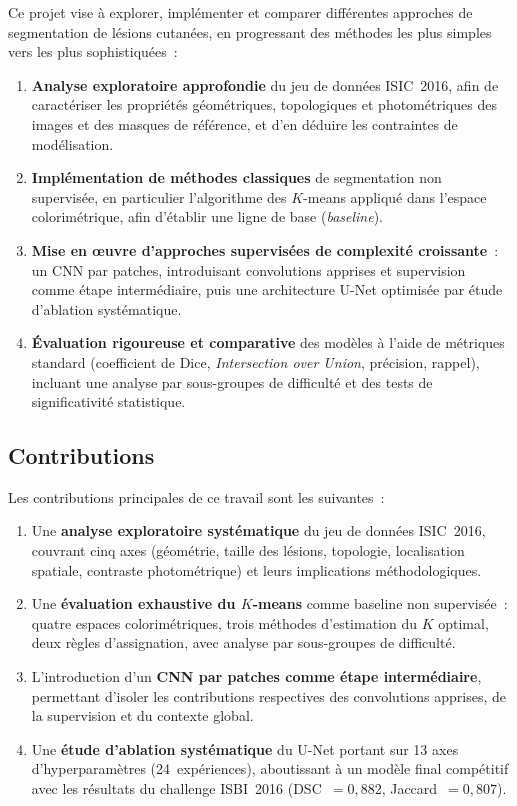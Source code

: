 \documentclass[12pt,a4paper]{article}
\begin{document}
Ce projet vise à explorer, implémenter et comparer différentes approches de segmentation de lésions cutanées, en progressant des méthodes les plus simples vers les plus sophistiquées~:
\begin{enumerate}[nosep]
    \item \textbf{Analyse exploratoire approfondie} du jeu de données ISIC~2016, afin de caractériser les propriétés géométriques, topologiques et photométriques des images et des masques de référence, et d'en déduire les contraintes de modélisation.
    \item \textbf{Implémentation de méthodes classiques} de segmentation non supervisée, en particulier l'algorithme des $K$-means appliqué dans l'espace colorimétrique, afin d'établir une ligne de base (\emph{baseline}).
    \item \textbf{Mise en \oe uvre d'approches supervisées de complexité croissante}~: un CNN par patches, introduisant convolutions apprises et supervision comme étape intermédiaire, puis une architecture U-Net \citep{ronneberger2015unet} optimisée par étude d'ablation systématique.
    \item \textbf{Évaluation rigoureuse et comparative} des modèles à l'aide de métriques standard (coefficient de Dice, \emph{Intersection over Union}, précision, rappel), incluant une analyse par sous-groupes de difficulté et des tests de significativité statistique.
\end{enumerate}

\subsection{Contributions}

Les contributions principales de ce travail sont les suivantes~:
\begin{enumerate}[nosep]
    \item Une \textbf{analyse exploratoire systématique} du jeu de données ISIC~2016, couvrant cinq axes (géométrie, taille des lésions, topologie, localisation spatiale, contraste photométrique) et leurs implications méthodologiques.
    \item Une \textbf{évaluation exhaustive du $K$-means} comme baseline non supervisée~: quatre espaces colorimétriques, trois méthodes d'estimation du $K$ optimal, deux règles d'assignation, avec analyse par sous-groupes de difficulté.
    \item L'introduction d'un \textbf{CNN par patches comme étape intermédiaire}, permettant d'isoler les contributions respectives des convolutions apprises, de la supervision et du contexte global.
    \item Une \textbf{étude d'ablation systématique} du U-Net portant sur 13 axes d'hyperparamètres (24~expériences), aboutissant à un modèle final compétitif avec les résultats du challenge ISBI~2016 (DSC~$= 0{,}882$, Jaccard~$= 0{,}807$).
\end{enumerate}
\end{document}
